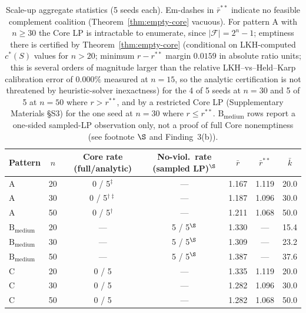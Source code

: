 \documentclass[11pt]{article}
\theoremstyle{plain}
\theoremstyle{definition}
\theoremstyle{remark}
\newcommand{\F}{\mathcal{F}}
\begin{document}
\begin{table}[t]
\centering
\caption{Scale-up aggregate statistics (5 seeds each). Em-dashes in $\bar r^{\ast\ast}$ indicate no feasible complement coalition (Theorem~\ref{thm:empty-core} vacuous). For pattern A with $n\ge 30$ the Core LP is intractable to enumerate, since $|\F|=2^n-1$; emptiness there is certified by Theorem~\ref{thm:empty-core} (conditional on LKH-computed $c^{\ast}(S)$ values for $n>20$; minimum $r-r^{\ast\ast}$ margin $0.0159$ in absolute ratio units; this is several orders of magnitude larger than the relative LKH--vs--Held--Karp calibration error of $0.000\%$ measured at $n=15$, so the analytic certification is not threatened by heuristic-solver inexactness) for the 4 of 5 seeds at $n=30$ and 5 of 5 at $n=50$ where $r>r^{\ast\ast}$, and by a restricted Core LP (Supplementary Materials \S S3) for the one seed at $n=30$ where $r\le r^{\ast\ast}$. $\text{B}_{\text{medium}}$ rows report a one-sided sampled-LP observation only, not a proof of full Core nonemptiness (see footnote $\S$ and Finding~3(b)).}
\label{tab:scaleup}
\small
\begin{tabular}{@{}lcccccc@{}}
\toprule
Pattern & $n$ & Core rate (full/analytic) & No-viol.\ rate (sampled LP)$^{\S}$ & $\bar r$ & $\bar r^{\ast\ast}$ & $\bar k$ \\
\midrule
A                          & 20 & 0 / 5$^{\ddagger}$       & ---   & 1.167 & 1.119 & 20.0 \\
A                          & 30 & 0 / 5$^{\dagger\ddagger}$ & ---   & 1.187 & 1.096 & 30.0 \\
A                          & 50 & 0 / 5$^{\dagger}$         & ---   & 1.211 & 1.068 & 50.0 \\
\midrule
$\text{B}_{\text{medium}}$ & 20 & --- & 5 / 5$^{\S}$ & 1.330 & --- & 15.4 \\
$\text{B}_{\text{medium}}$ & 30 & --- & 5 / 5$^{\S}$ & 1.309 & --- & 23.2 \\
$\text{B}_{\text{medium}}$ & 50 & --- & 5 / 5$^{\S}$ & 1.387 & --- & 37.6 \\
\midrule
C                          & 20 & 0 / 5 & --- & 1.335 & 1.119 & 20.0 \\
C                          & 30 & 0 / 5 & --- & 1.282 & 1.096 & 30.0 \\
C                          & 50 & 0 / 5 & --- & 1.282 & 1.068 & 50.0 \\
\bottomrule
\end{tabular}


\end{table}
\end{document}
